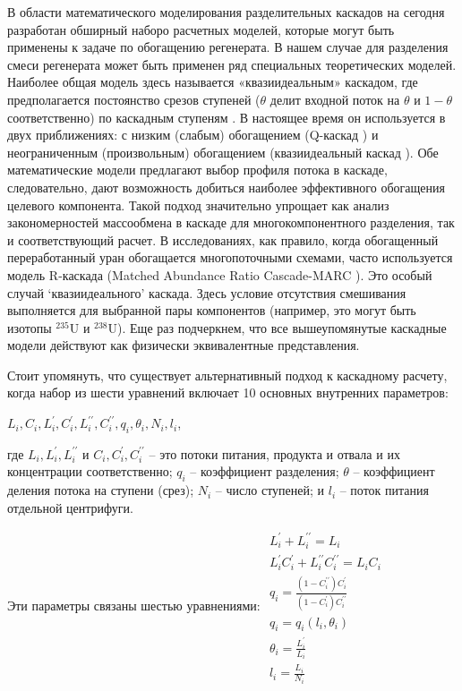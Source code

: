В области математического моделирования разделительных каскадов на сегодня разработан обширный наборо расчетных моделей, которые могут быть применены к задаче по обогащению регенерата. В нашем случае для разделения смеси регенерата может быть применен ряд специальных теоретических моделей. Наиболее общая модель здесь называется «квазиидеальным» каскадом, где предполагается постоянство срезов ступеней ($\theta$ делит входной поток на $\theta$ и $1 - \theta$ соответственно) по каскадным ступеням \cite{yamamotoMulticomponentIsotopeSeparating1978}. В настоящее время он используется в двух приближениях: с низким (слабым) обогащением (Q-каскад \cite{borisevichNewApproachOptimize2011, kolokoltsovDesignCascadesSeparating1970, zengQCascadeExplanation2012}) и неограниченным (произвольным) обогащением (квазиидеальный каскад \cite{sulaberidzeSpecialFeaturesEnrichment2006}). Обе математические модели предлагают выбор профиля потока в каскаде, следовательно, дают возможность добиться наиболее эффективного обогащения целевого компонента. Такой подход значительно упрощает как анализ закономерностей массообмена в каскаде для многокомпонентного разделения, так и соответствующий расчет. В исследованиях, как правило, когда обогащенный переработанный уран обогащается многопоточными схемами, часто используется модель R-каскада (Matched Abundance Ratio Cascade-MARC \cite{delagarzaMulticomponentIsotopeSeparation1961, woodEffectsSeparationProcesses2008, kazukihidaSimultaneousEvaluationEffects}). Это особый случай `квазиидеального' каскада. Здесь условие отсутствия смешивания выполняется для выбранной пары компонентов (например, это могут быть изотопы $^{235}$U и $^{238}$U). Еще раз подчеркнем, что все вышеупомянутые каскадные модели действуют как физически эквивалентные представления. 

Стоит упомянуть, что существует альтернативный подход к каскадному расчету, когда набор из шести уравнений включает 10 основных внутренних параметров:

$L_{i}, C_{i}, L_{i}^{\prime}, C_{i}^{\prime}, L_{i}^{\prime \prime}, C_{i}^{\prime \prime}, q_{i}, \theta_{i}, N_{i}, l_{i}$,

где $L_{i}, L_{i}^{\prime}, L_{i}^{\prime \prime}$ и $C_{i}, C_{i}^{\prime}, C_{i}^{\prime \prime}$ -- 
это потоки питания, продукта и отвала и их концентрации соответственно; $q_{i}$ -- коэффициент разделения; $\theta$ -- коэффициент деления потока на ступени (срез); $N_{i}$ -- число ступеней; и $l_{i}$ -- поток питания отдельной центрифуги.

Эти параметры связаны шестью уравнениями:
$\begin{array}{c}
  {L_{i}^{\prime}+L_{i}^{\prime \prime}=L_{i}} \\
  {L_{i}^{\prime} C_{i}^{\prime}+L_{i}^{\prime \prime} C_{i}^{\prime \prime}=L_{i} C_{i}} \\
  {q_{i}=\frac{(1-C_{i}^{\prime \prime}) C_{i}^{\prime}}{(1-C_{i}^{\prime}) C_{i}^{\prime \prime}}} \\
  {q_{i}=q_{i}\left(l_{i}, \theta_{i}\right)} \\
  {\theta_{i}=\frac{L_{i}^{\prime}}{L_{i}}} \\
  {l_{i}=\frac{L_{i}}{N_{i}}}
\end{array}$


